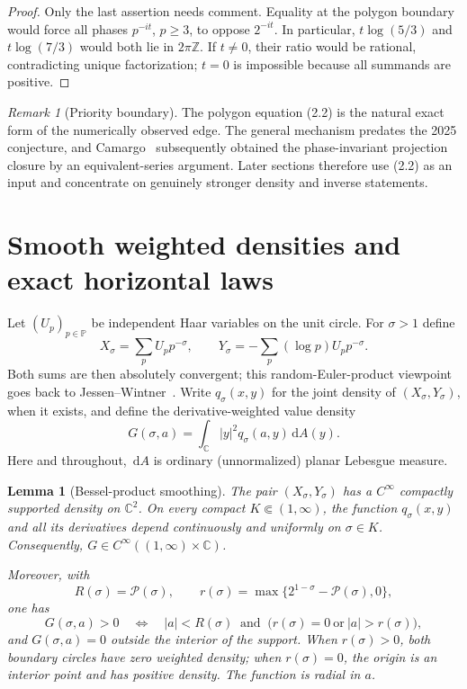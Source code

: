 \documentclass[11pt]{article}
\newtheorem{lemma}[theorem]{Lemma}
\theoremstyle{definition}
\theoremstyle{remark}
\newtheorem{remark}[theorem]{Remark}
\newcommand{\PP}{\mathbb P}
\newcommand{\cP}{\mathcal P}
\newcommand{\dd}{\,\mathrm d}
\newcommand{\C}{\mathbb C}
\begin{document}
\begin{proof}
Only the last assertion needs comment.  Equality at the polygon boundary would force
all phases $p^{-it}$, $p\ge3$, to oppose $2^{-it}$.  In particular,
$t\log(5/3)$ and $t\log(7/3)$ would both lie in $2\pi\mathbb Z$.  If $t\ne0$, their
ratio would be rational, contradicting unique factorization; $t=0$ is impossible
because all summands are positive.
\end{proof}

\begin{remark}[Priority boundary]
\label{rem:priority-boundary}
The polygon equation (2.2) is the natural exact form of the numerically observed edge.
The general mechanism predates the 2025 conjecture, and Camargo~\cite{Camargo2025}
subsequently obtained the phase-invariant projection closure by an equivalent-series
argument.  Later sections therefore use (2.2) as an input and concentrate on genuinely
stronger density and inverse statements.
\end{remark}

\section{Smooth weighted densities and exact horizontal laws}
\label{sec:smooth-density}

Let $(U_p)_{p\in\PP}$ be independent Haar variables on the unit circle.  For
$\sigma>1$ define
\[
 X_\sigma=\sum_pU_pp^{-\sigma},
 \qquad
 Y_\sigma=-\sum_p(\log p)U_pp^{-\sigma}.
\tag{3.1}
\]
Both sums are then absolutely convergent; this random-Euler-product viewpoint goes
back to Jessen--Wintner~\cite{JessenWintner1935}.  Write $q_\sigma(x,y)$ for the joint
density of $(X_\sigma,Y_\sigma)$, when it exists, and define the derivative-weighted
value density
\[
 G(\sigma,a)=\int_\C |y|^2q_\sigma(a,y)\dd A(y).
\tag{3.2}
\]
Here and throughout, $\dd A$ is ordinary (unnormalized) planar Lebesgue measure.

\begin{lemma}[Bessel-product smoothing]
\label{lem:bessel-smoothing}
The pair $(X_\sigma,Y_\sigma)$ has a $C^\infty$ compactly supported density on
$\C^2$.  On every compact $K\Subset(1,\infty)$, the function
$q_\sigma(x,y)$ and all its derivatives depend continuously and uniformly on
$\sigma\in K$.  Consequently, $G\in C^\infty((1,\infty)\times\C)$.

Moreover, with
\[
 R(\sigma)=\cP(\sigma),
 \qquad
 r(\sigma)=\max\{2^{1-\sigma}-\cP(\sigma),0\},
\tag{3.3}
\]
one has
\[
 G(\sigma,a)>0
 \quad\Longleftrightarrow\quad
 |a|<R(\sigma)\ \text{ and }\ \bigl(r(\sigma)=0\ \text{or}\ |a|>r(\sigma)\bigr),
\tag{3.4}
\]
and $G(\sigma,a)=0$ outside the interior of the support.  When $r(\sigma)>0$,
both boundary circles have zero weighted density; when $r(\sigma)=0$, the origin is
an interior point and has positive density.
The function is radial in $a$.
\end{lemma}
\end{document}
